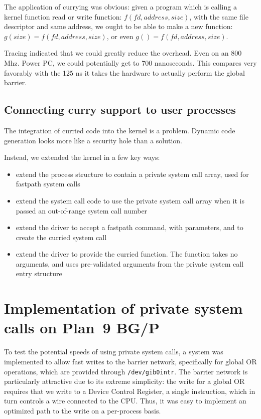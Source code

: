 \documentclass[letterpaper]{article}
\begin{document}
The application of currying was obvious: given a program which is calling a kernel function read or write function: $ f\left( fd, address, size\right) $, with 
the same file descriptor and same address, we ought to be able to make a new function: 
$g\left( size\right) = f\left( fd, address, size\right)$, or even 
$g\left( \right) = f\left( fd, address, size\right)$. 

Tracing indicated that we could greatly reduce the overhead. Even on an 800 Mhz. Power PC, we could 
potentially get to 700 nanoseconds. This compares very favorably with the 125 ns it takes the hardware to actually
perform the global barrier. 

\subsection{Connecting curry support to user processes}
The integration of curried code into the kernel is a problem. 
Dynamic code generation looks more like a security
hole than a solution. 

Instead, we extended the kernel in a few key ways: 
\begin{itemize}
\item extend the process structure to contain a private system call array, used for fastpath system calls
\item extend the system call code to use the private system call array when it is passed an out-of-range system 
call number
\item extend the driver to accept a fastpath command, with parameters, and to create the curried system call
\item extend the driver to provide the curried function. The function takes no arguments, 
and uses pre-validated arguments from the private system call entry structure
\end{itemize}

\section{Implementation of private system calls on Plan~9 BG/P}
To test the potential speeds of using private system calls, a system was implemented to allow fast writes to the barrier network, specifically for global OR operations, which are provided through {\tt /dev/gib0intr}. The barrier network is particularly attractive due to its extreme simplicity: the write for a global OR requires that we write to a 
Device Control Register, a single instruction, which in turn controls a
wire connected to the CPU. Thus, it was easy to implement an optimized path to the write on a per-process basis.
\end{document}
